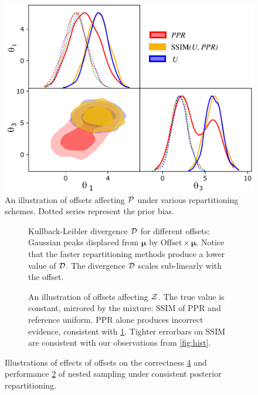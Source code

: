 \documentclass[usenatbib]{mnras}
\begin{document}
\begin{figure}
  \includegraphics[width=0.99\columnwidth]{./illustrations/convergence.pdf}
\caption{An illustration of offsets affecting ${\cal P}$ under various
  repartitioning schemes. Dotted series represent the prior
  bias. \label{fig:convergence}}
\end{figure}

\begin{figure} \centering
  \begin{subfigure}{0.99\columnwidth}
    \centering

    
    \caption{Kullback-Leibler divergence \({\cal D}\) for different
      offsets: Gaussian peaks displaced from \(\bm{\mu}\) by
      \(\text{Offset}\times \bm{\mu}\). Notice that the faster
      repartitioning methods produce a lower value of \({\cal
        D}\). The divergence \({\cal D}\) scales sub-linearly with the
      offset.\label{fig:kl-d}}
\end{subfigure}

\begin{subfigure}{0.99\columnwidth}
  \centering

  
  
  \caption{An illustration of offsets affecting ${\cal Z}$. The true
    value is constant, mirrored by the mixture: SSIM of PPR and
    reference uniform. PPR alone produces incorrect evidence,
    consistent with \cref{fig:convergence}. Tighter errorbars on SSIM
    are consistent with our observations from
    \cref{fig:hist}.\label{fig:drift}}
\end{subfigure}
\caption{Illustrations of effects of offsets on the correctness
  \ref{fig:drift} and performance \ref{fig:kl-d} of nested sampling
  under consistent posterior repartitioning.}
\end{figure}
\end{document}
